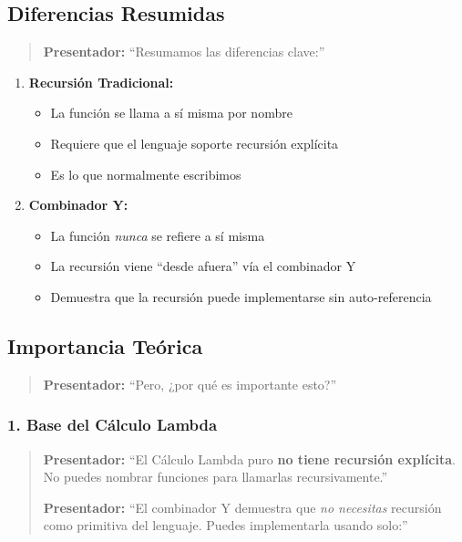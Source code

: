 \documentclass[12pt]{article}
\begin{document}
\subsection*{Diferencias Resumidas}

\begin{quote}
\textbf{Presentador:} ``Resumamos las diferencias clave:''
\end{quote}

\begin{enumerate}
\item \textbf{Recursión Tradicional:}
    \begin{itemize}
    \item La función se llama a sí misma por nombre
    \item Requiere que el lenguaje soporte recursión explícita
    \item Es lo que normalmente escribimos
    \end{itemize}

\item \textbf{Combinador Y:}
    \begin{itemize}
    \item La función \textit{nunca} se refiere a sí misma
    \item La recursión viene ``desde afuera'' vía el combinador Y
    \item Demuestra que la recursión puede implementarse sin auto-referencia
    \end{itemize}
\end{enumerate}

\newpage
\subsection*{Importancia Teórica}

\begin{quote}
\textbf{Presentador:} ``Pero, ¿por qué es importante esto?''
\end{quote}

\subsubsection*{1. Base del Cálculo Lambda}

\begin{quote}
\textbf{Presentador:} ``El Cálculo Lambda puro \textbf{no tiene recursión explícita}. No puedes nombrar funciones para llamarlas recursivamente.''

\textbf{Presentador:} ``El combinador Y demuestra que \textit{no necesitas} recursión como primitiva del lenguaje. Puedes implementarla usando solo:''
\end{quote}
\end{document}
